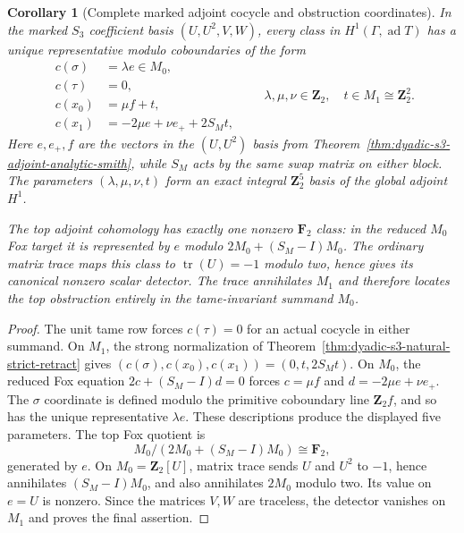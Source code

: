 \documentclass[11pt]{article}
\newtheorem{corollary}[theorem]{Corollary}
\theoremstyle{definition}
\begin{document}
\begin{corollary}[Complete marked adjoint cocycle and obstruction coordinates]
\label{cor:dyadic-s3-adjoint-explicit-h1-h2}
In the marked $S_3$ coefficient basis
$(U,U^2,V,W)$, every class in
$H^1(\Gamma,\operatorname{ad}T)$ has
a unique representative modulo
coboundaries of the form
\begin{equation}\label{eq:dyadic-s3-adjoint-normalized-cocycles}
\boxed{
\begin{aligned}
c(\sigma)&=\lambda e\in M_0,\\
c(\tau)&=0,\\
c(x_0)&=\mu f+t,\\
c(x_1)&=-2\mu e+\nu e_++2S_M t,
\end{aligned}
\qquad
\lambda,\mu,\nu\in\mathbf Z_2,\quad
t\in M_1\cong\mathbf Z_2^2.
}
\end{equation}
Here $e,e_+,f$ are the vectors
in the $(U,U^2)$ basis from
Theorem~\ref{thm:dyadic-s3-adjoint-analytic-smith},
while $S_M$ acts by the same swap
matrix on either block.
The parameters
$(\lambda,\mu,\nu,t)$ form
an exact integral
$\mathbf Z_2^5$ basis
of the global adjoint
$H^1$.

The top adjoint cohomology
has exactly one nonzero
$\mathbf F_2$ class:
in the reduced $M_0$
Fox target it is represented
by $e$ modulo
$2M_0+(S_M-I)M_0$.
The ordinary matrix trace
maps this class to
$\operatorname{tr}(U)=-1$
modulo two, hence
gives its canonical
nonzero scalar detector.
The trace annihilates
$M_1$ and therefore
locates the top
obstruction \emph{entirely}
in the tame-invariant
summand $M_0$.
\end{corollary}

\begin{proof}
The unit tame row forces
$c(\tau)=0$ for an actual
cocycle in either summand.
On $M_1$, the strong
normalization of
Theorem~\ref{thm:dyadic-s3-natural-strict-retract}
gives $(c(\sigma),c(x_0),c(x_1))
=(0,t,2S_Mt)$.
On $M_0$, the reduced Fox
equation $2c+(S_M-I)d=0$
forces $c=\mu f$ and
$d=-2\mu e+\nu e_+$.
The $\sigma$ coordinate is
defined modulo the primitive
coboundary line $\mathbf Z_2 f$,
and so has the unique
representative $\lambda e$.
These descriptions produce
the displayed five parameters.
The top Fox quotient is
\[
M_0/(2M_0+(S_M-I)M_0)
\cong\mathbf F_2,
\]
generated by $e$.
On $M_0=\mathbf Z_2[U]$,
matrix trace sends $U$ and
$U^2$ to $-1$, hence
annihilates $(S_M-I)M_0$,
and also annihilates
$2M_0$ modulo two.
Its value on $e=U$
is nonzero.  Since the
matrices $V,W$ are traceless,
the detector vanishes on
$M_1$ and proves the
final assertion.
\end{proof}
\end{document}
